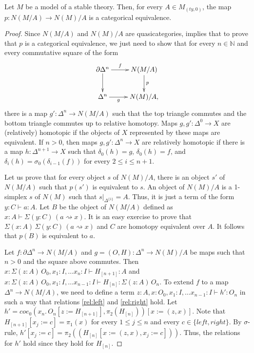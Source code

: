 \documentclass[reqno]{amsart}
\theoremstyle{definition}
\theoremstyle{remark}
\newcommand{\repl}{:=}
\newcommand{\idtype}{\rightsquigarrow}
\numberwithin{figure}{section}
\begin{document}
\begin{prop}
Let $M$ be a model of a stable theory.
Then, for every $A \in M_{(ty,0)}$, the map $p : N(M/A) \to N(M)/A$ is a categorical equivalence.
\end{prop}
\begin{proof}
Since $N(M/A)$ and $N(M)/A$ are quasicategories, \cite[Proposition~3.5]{f-model-structures} implies that to prove that $p$ is a categorical equivalence,
we just need to show that for every $n \in \mathbb{N}$ and every commutative square of the form
\[ \xymatrix{ \partial \Delta^n \ar[r]^-f \ar[d] & N(M/A) \ar[d]^p \\
              \Delta^n \ar[r]_-g                 & N(M)/A,
            } \]
there is a map $g' : \Delta^n \to N(M/A)$ such that the top triangle commutes and the bottom triangle commutes up to relative homotopy.
Maps $g,g' : \Delta^0 \to X$ are (relatively) homotopic if the objects of $X$ represented by these maps are equivalent.
If $n > 0$, then maps $g,g' : \Delta^n \to X$ are relatively homotopic if there is a map $h : \Delta^{n+1} \to X$
such that $\delta_0(h) = g$, $\delta_0(h) = f$, and $\delta_i(h) = \sigma_0(\delta_{i-1}(f))$ for every $2 \leq i \leq n+1$.

Let us prove that for every object $s$ of $N(M)/A$, there is an object $s'$ of $N(M/A)$ such that $p(s')$ is equivalent to $s$.
An object of $N(M)/A$ is a 1-simplex $s$ of $N(M)$ such that $s|_{\Delta^{\{1\}}} = A$.
Thus, it is just a term of the form $y : C \vdash a : A$.
Let $B$ be the object of $N(M/A)$ defined as $x : A \vdash \Sigma (y : C)\,(a \idtype x)$.
It is an easy exercise to prove that $\Sigma (x : A)\,\Sigma (y : C)\,(a \idtype x)$ and $C$ are homotopy equivalent over $A$.
It follows that $p(B)$ is equivalent to $a$.

Let $f : \partial \Delta^n \to N(M/A)$ and $g = (O,H) : \Delta^n \to N(M)/A$ be maps such that $n > 0$ and the square above commutes.
Then $x : \Sigma (z : A)\,O_0, x_1 : I, \ldots x_n : I \vdash H_{[n+1]} : A$ and
$x : \Sigma (z : A)\,O_0, x_1 : I, \ldots x_{n-1} : I \vdash H_{[n]} : \Sigma (z : A)\,O_n$.
To extend $f$ to a map $\Delta^n \to N(M/A)$, we need to define a term $z : A, x : O_0, x_1 : I, \ldots x_{n-1} : I \vdash h' : O_n$
in such a way that relations \eqref{rel:left} and \eqref{rel:right} hold.
Let $h' = coe_0(x_n.\,O_n[z \repl H_{[n+1]}], \pi_2(H_{[n]}))[x \repl (z,x)]$.
Note that $H_{[n+1]}[x_j \repl c] = \pi_1(x)$ for every $1 \leq j \leq n$ and every $c \in \{ left, right \}$.
By $\sigma$-rule, $h'[x_j \repl c] = \pi_2((H_{[n]}[x \repl (z,x), x_j \repl c]))$.
Thus, the relations for $h'$ hold since they hold for $H_{[n]}$.


\end{proof}
\end{document}
